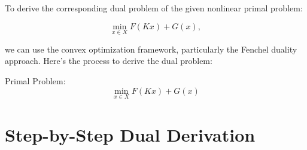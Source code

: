 \documentclass[12pt]{article}
\begin{document}




To derive the corresponding dual problem of the given nonlinear primal problem:

\begin{equation}
\min_{x \in X} F(Kx) + G(x),
\end{equation}

we can use the convex optimization framework, particularly the Fenchel duality approach. Here’s the process to derive the dual problem:

Primal Problem:
\begin{equation}
\min_{x \in X} F(Kx) + G(x)
\end{equation}

\section*{Step-by-Step Dual Derivation}
\end{document}
